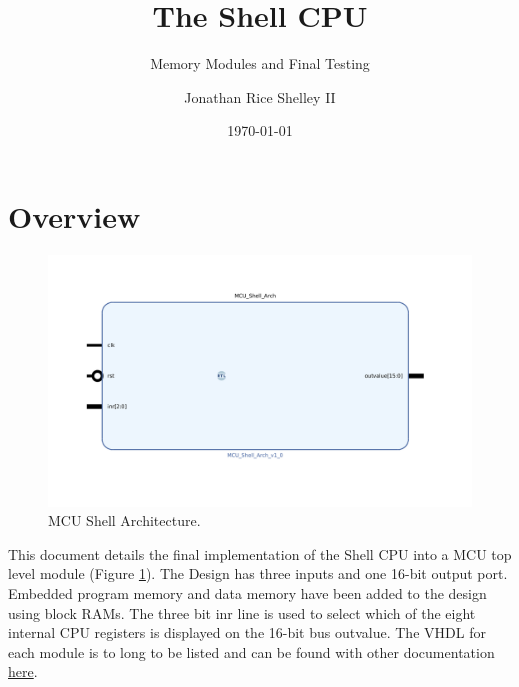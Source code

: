 \documentclass{article}
\subtitle{Memory Modules and Final Testing}
\title{The Shell CPU}
\author{Jonathan Rice Shelley II}
\date{\today}
\begin{document}
\maketitle

\tableofcontents

\section{Overview}
\begin{par}
	
	\begin{figure}[H]
		\centering
		\includegraphics[width=5in]{img/mcu.png}
		\caption{ MCU Shell Architecture. }
		\label{fig:mcu}
	\end{figure}
	
	This document details the final implementation of the Shell CPU into a MCU top level module (Figure \ref{fig:mcu}). The Design has three inputs and one 16-bit output port. Embedded program memory and data memory have been added to the design using block RAMs. The three bit inr line is used to select which of the eight internal CPU registers is displayed on the 16-bit bus outvalue. The VHDL for each module is to long to be listed and can be found with other documentation \href{https://github.com/RiceShelley/ShellCPU}{here}. 
	
\end{par}
\end{document}
